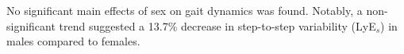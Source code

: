 \documentclass[authoryear,preprint,review,12pt]{elsarticle}
\begin{document}
No significant main effects of sex on gait dynamics was found. Notably, a non-significant trend suggested a 13.7\% decrease in step-to-step variability (LyE${_s}$) in males compared to females.





\end{document}
